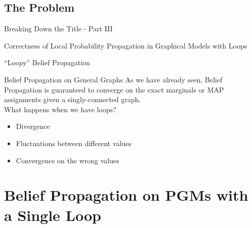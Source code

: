 \documentclass{beamer}
\begin{document}
\subsection{The Problem}
\begin{frame}{Breaking Down the Title - Part III}
    \begin{center}
        \Large{Correctness of \alert<1>{Local Probability Propagation} in Graphical Models with \alert<2>{Loops}}
    \end{center}
\end{frame}
\begin{frame}{``Loopy'' Belief Propagation}
    \begin{block}{Belief Propagation on General Graphs}
        As we have already seen, Belief Propagation is guaranteed to converge on the exact marginals or MAP assignments given a singly-connected graph.\\
        What happens when we have loops?
        \pause
        \begin{itemize}[<+->]
            \item Divergence
            \item Fluctuations between different values
            \item Convergence on the wrong values
        \end{itemize}
    \end{block}
\end{frame}
\section{Belief Propagation on PGMs with a Single Loop}
\end{document}
